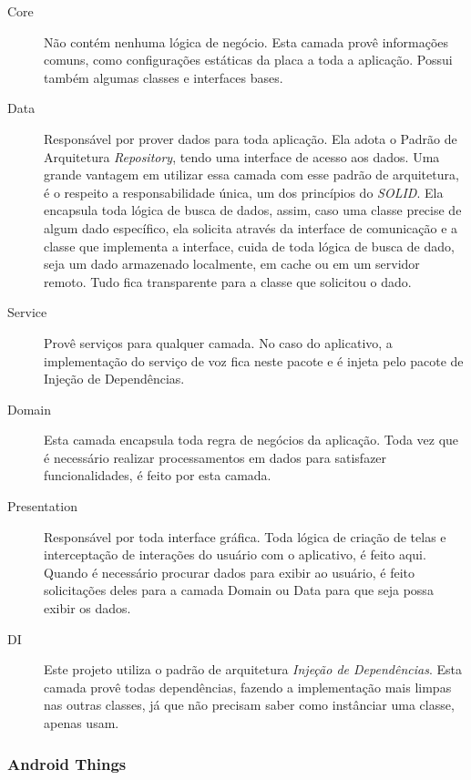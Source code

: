 \documentclass[
	12pt,				%
	oneside,			%
	a4paper,			%
	brazil				%
]{abntex2}
\begin{document}
{\begin{description}

\item[Core] Não contém nenhuma lógica de negócio. Esta camada provê informações comuns, como configurações estáticas da placa a toda a aplicação. Possui também algumas classes e interfaces bases.

\item[Data] Responsável por prover dados para toda aplicação. Ela adota o Padrão de Arquitetura \textit{Repository}, tendo uma interface de acesso aos dados. Uma grande vantagem em utilizar essa camada com esse padrão de arquitetura, é o respeito a responsabilidade única, um dos princípios do \textit{SOLID}. Ela encapsula toda lógica de busca de dados, assim, caso uma classe precise de algum dado específico, ela solicita através da interface de comunicação e a classe que implementa a interface, cuida de toda lógica de busca de dado, seja um dado armazenado localmente, em cache ou em um servidor remoto. Tudo fica transparente para a classe que solicitou o dado.

\item[Service] Provê serviços para qualquer camada. No caso do aplicativo, a implementação do serviço de voz fica neste pacote e é injeta pelo pacote de Injeção de Dependências.

\item[Domain] Esta camada encapsula toda regra de negócios da aplicação. Toda vez que é necessário realizar processamentos em dados para satisfazer funcionalidades, é feito por esta camada.

\item[Presentation] Responsável por toda interface gráfica. Toda lógica de criação de telas e interceptação de interações do usuário com o aplicativo, é feito aqui. Quando é necessário procurar dados para exibir ao usuário, é feito solicitações deles para a camada Domain ou Data para que seja possa exibir os dados.

\item[DI] Este projeto utiliza o padrão de arquitetura \textit{Injeção de Dependências}. Esta camada provê todas dependências, fazendo a implementação mais limpas nas outras classes, já que não precisam saber como instânciar uma classe, apenas usam.
 
\end{description}

\subsubsection{Android Things}

}
\end{document}
